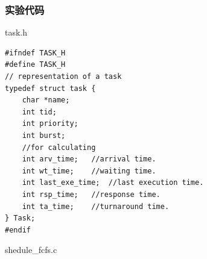 \documentclass{article}
\begin{document}
\subsubsection{实验代码}
\begin{center}
{\ttfamily task.h}
\end{center}
\begin{lstlisting}[language={[ANSI]C}]
#ifndef TASK_H
#define TASK_H
// representation of a task
typedef struct task {
	char *name;
	int tid;
	int priority;
	int burst;
    //for calculating
	int arv_time;	//arrival time.
	int wt_time;	//waiting time.
	int last_exe_time;	//last execution time.
	int rsp_time;	//response time.
	int ta_time;	//turnaround time.
} Task;
#endif
\end{lstlisting}
\begin{center}
{\ttfamily shedule\_fcfs.c}
\end{center}
\end{document}
